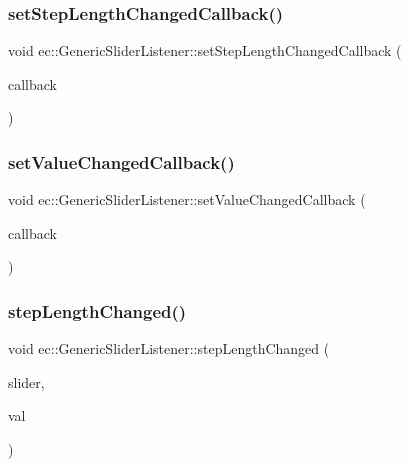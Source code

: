 \subsubsection{\texorpdfstring{set\+Step\+Length\+Changed\+Callback()}{setStepLengthChangedCallback()}}
{\footnotesize\ttfamily void ec\+::\+Generic\+Slider\+Listener\+::set\+Step\+Length\+Changed\+Callback (\begin{DoxyParamCaption}\item[{const \mbox{\hyperlink{classec_1_1_generic_slider_listener_afde2dc39404d84bb597b9cc4be265814}{Step\+Length\+Changed\+\_\+\+Callback}} \&}]{callback }\end{DoxyParamCaption})}

\mbox{\label{classec_1_1_generic_slider_listener_a1f01d60c85706082ddc4372d919e42c7}} 
\subsubsection{\texorpdfstring{set\+Value\+Changed\+Callback()}{setValueChangedCallback()}}
{\footnotesize\ttfamily void ec\+::\+Generic\+Slider\+Listener\+::set\+Value\+Changed\+Callback (\begin{DoxyParamCaption}\item[{const \mbox{\hyperlink{classec_1_1_generic_slider_listener_ab4562c9d0ca6599598d872bf6fb45cfb}{Value\+Changed\+\_\+\+Callback}} \&}]{callback }\end{DoxyParamCaption})}

\mbox{\label{classec_1_1_generic_slider_listener_af6958b779d400924196cff0c0d74ff76}} 
\subsubsection{\texorpdfstring{step\+Length\+Changed()}{stepLengthChanged()}}
{\footnotesize\ttfamily void ec\+::\+Generic\+Slider\+Listener\+::step\+Length\+Changed (\begin{DoxyParamCaption}\item[{agui\+::\+Slider $\ast$}]{slider,  }\item[{int}]{val }\end{DoxyParamCaption})\hspace{0.3cm}{\ttfamily [override]}}


